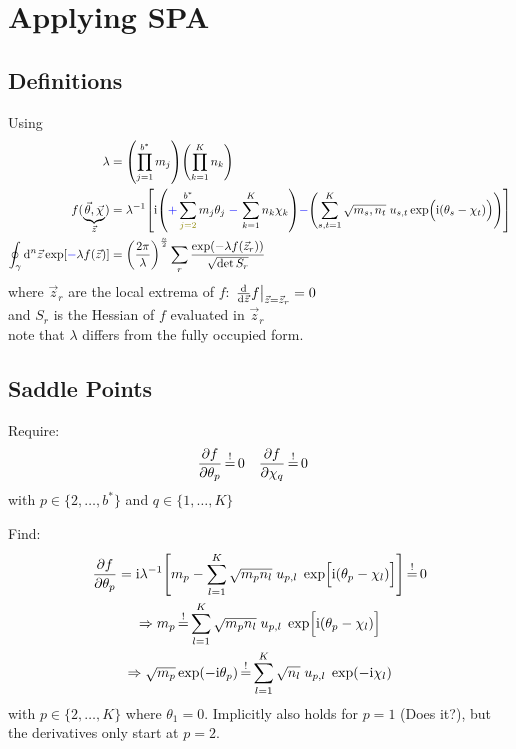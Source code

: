 \documentclass[
	english,
	a4paper,
	fontsize=10pt,
	parskip=half,
	titlepage=true,
	DIV=12,
	final
]{scrreprt}
\newcommand*{\Thus}{\ensuremath{\Rightarrow}\xspace}
\newcommand*{\iunit}{\ensuremath{\mathrm{i}}}
\newcommand*{\equalCond}{  \mathop{=}\limits^!  }
\begin{document}
\section{Applying SPA}
\subsection{Definitions}
Using
\begin{align}
	\lambda
&=
	\qty( \prod_{j=1}^{b^*} m_j )
	\qty( \prod_{k=1}^{K}   n_k )
\label{eqn:DefLambda_m}
\\
	f(
		\underbrace{ \vec{\theta}, \vec{\chi} }_{\vec{z}}
	)
&=
	\lambda^{-1}
	\qty[
		\iunit
		\qty(
			{\color{blue} +}
			\sum_{{\color{olive}j=2}}^{b^*}
				m_j \theta_j \;
			{\color{blue} -} \,
			\sum_{k=1}^{K}
				n_k \chi  _k
		)
	{\color{blue} -}
		\qty(
			\sum_{s,t=1}^{K}
			\sqrt{m_s, n_t} \;
			u_{s,t}
			\exp(\Big.
				\iunit(\theta_s - \chi_t)
			)
		)
	]
\\
	\oint_{\gamma} \dd[n]{\vec{z}}
		\exp[{\color{blue} -}\lambda f(\vec{z})]
&=
	\qty( \frac
		{2\pi}
		{\lambda}
	)^{\frac{n}{2}}
	\sum_{r}
		\frac
		{\exp(-\lambda f(\vec{z}_r))}
		{\sqrt{\det S_r}}
\label{eqn:Def_SPA}
\end{align}
where $\vec{z}_r$ are the local extrema of $f$: $\eval{\dv{\vec{z}}f}_{\vec{z} = \vec{z}_r} = 0$\\
and $S_r$ is the Hessian of $f$ evaluated in $\vec{z}_r$\\
{\color{red} note that $\lambda$ differs from the fully occupied form.}

\subsection{Saddle Points}
\label{sec:saddles}
Require:
\begin{align}
	\pdv{f}{\theta_p} &\equalCond 0
&
	\pdv{f}{\chi  _q} &\equalCond 0 
\end{align}
with $p \in \{2, \ldots, b^*\}$ and $q \in \{1, \ldots, K\}$

Find:
\begin{gather}
	\pdv{f}{\theta_p}
=
	\iunit \lambda^{-1}
	\qty[
		m_p
		-
		\sum_{l=1}^{K}
			\sqrt{m_p n_l} \; u_{p,l} \; \exp[ \Big. \iunit(\theta_p - \chi_l)]
	]
	\label{eqn:Jacobiantheta_m}
\equalCond
	0 \\
\Thus
	m_p
\equalCond
	\sum_{l=1}^{K}
		\sqrt{m_p n_l} \; u_{p,l} \; \exp[ \Big. \iunit(\theta_p - \chi_l) ] \\
\Thus
	\sqrt{m_p} \exp(-\iunit \theta_p)
\equalCond
	\sum_{l=1}^{K} \sqrt{n_l} \; u_{p,l} \; \exp(-\iunit\chi_l)
	\label{eqn:FourierLinkForward_m}
\end{gather}
with $p \in \{2, \ldots, K\}$ where $\theta_1 = 0$. Implicitly also holds for $p=1$ {\color{red}(Does it?)}, but the derivatives only start at $p=2$.
\end{document}
